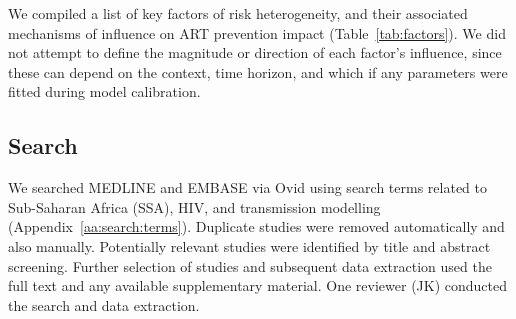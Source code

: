 We compiled a list of key factors of risk heterogeneity,
and their associated mechanisms of influence on ART prevention impact (Table~\ref{tab:factors}).
We did not attempt to define the magnitude or direction of each factor's influence,
since these can depend on the context, time horizon,
and which if any parameters were fitted during model calibration.\cite{Eaton2014}
\subsection{Search}
\label{ss:meth:search}
We searched MEDLINE and EMBASE via Ovid
using search terms related to Sub-Saharan Africa (SSA), HIV, and transmission modelling
(Appendix~\ref{aa:search:terms}).
Duplicate studies were removed automatically and also manually.
Potentially relevant studies were identified by title and abstract screening.
Further selection of studies and subsequent data extraction used
the full text and any available supplementary material.
One reviewer (JK) conducted the search and data extraction.
